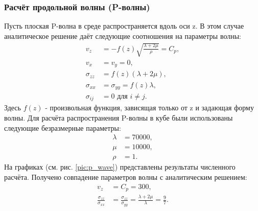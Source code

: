 \subsubsection{Расчёт продольной волны (P-волны)}
Пусть плоская P-волна в среде распространяется вдоль оси z. В этом случае аналитическое решение даёт следующие соотношения на параметры волны:
\begin{align}
v_z&=-f(z)\sqrt{\frac{\lambda+2\mu}{\rho}}=C_p, \nonumber\\
v_x&=v_y=0, \nonumber\\
\sigma_{zz}&=f(z)(\lambda+2\mu), \nonumber\\
\sigma_{xx}&=\sigma_{yy}=f(z)\lambda, \nonumber\\
\sigma_{ij}&=0 \textrm{ для } i \neq j.
\end{align}
Здесь $f(z)$ - произвольная функция, зависящая только от z и задающая форму волны.
Для расчёта распространения P-волны в кубе были использованы следующие безразмерные параметры: 
\begin{align}
\lambda&=70000, \nonumber\\
\mu&=10000, \nonumber\\
\rho&=1.
\end{align}
На графиках (см. рис. \ref{pic:p_wave}) представлены результаты численного расчёта. Получено совпадение параметров волны с аналитическим решением:
\begin{align}
v_z&=C_p=300, \nonumber\\
\frac{\sigma_{zz}}{\sigma_{xx}}&=\frac{\sigma_{zz}}{\sigma_{yy}}=\frac{\lambda+2\mu}{\lambda}=\frac{9}{7}.
\end{align}

